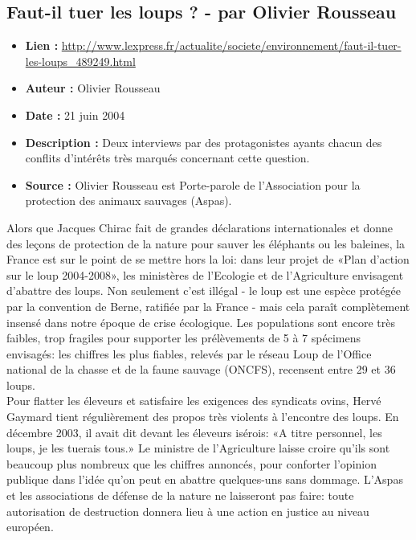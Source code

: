 \documentclass[8pt]{article}
\begin{document}
\newpage
\subsection{Faut-il tuer les loups ? - par Olivier Rousseau}
\begin{itemize}
	\item \textbf{Lien : }  \url{http://www.lexpress.fr/actualite/societe/environnement/faut-il-tuer-les-loups_489249.html} 
	\item \textbf{Auteur : } Olivier Rousseau
	\item \textbf{Date : } 21 juin 2004
	\item \textbf{Description : } Deux interviews par des protagonistes ayants chacun des conflits d'intérêts très marqués concernant cette question.
	\item \textbf{Source : } Olivier Rousseau est Porte-parole de l'Association pour la protection des animaux sauvages (Aspas).
\end{itemize}

Alors que Jacques Chirac fait de grandes déclarations internationales et donne des leçons de protection de la nature pour sauver les éléphants ou les baleines, la France est sur le point de se mettre hors la loi: dans leur projet de «Plan d'action sur le loup 2004-2008», les ministères de l'Ecologie et de l'Agriculture envisagent d'abattre des loups. Non seulement c'est illégal - le loup est une espèce protégée par la convention de Berne, ratifiée par la France - mais cela paraît complètement insensé dans notre époque de crise écologique. Les populations sont encore très faibles, trop fragiles pour supporter les prélèvements de 5 à 7 spécimens envisagés: les chiffres les plus fiables, relevés par le réseau Loup de l'Office national de la chasse et de la faune sauvage (ONCFS), recensent entre 29 et 36 loups. \\

Pour flatter les éleveurs et satisfaire les exigences des syndicats ovins, Hervé Gaymard tient régulièrement des propos très violents à l'encontre des loups. En décembre 2003, il avait dit devant les éleveurs isérois: «A titre personnel, les loups, je les tuerais tous.» Le ministre de l'Agriculture laisse croire qu'ils sont beaucoup plus nombreux que les chiffres annoncés, pour conforter l'opinion publique dans l'idée qu'on peut en abattre quelques-uns sans dommage. L'Aspas et les associations de défense de la nature ne laisseront pas faire: toute autorisation de destruction donnera lieu à une action en justice au niveau européen. \\
\end{document}
